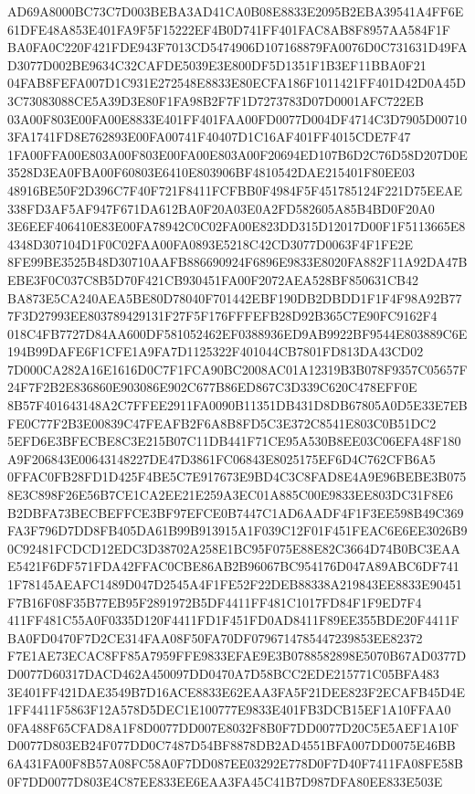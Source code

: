 \documentclass[UTF8,fontset=fandol,zihao=-4,a4paper]{ctexart}
\begin{document}
{{AD69A8000BC73C7D003BEBA3AD41CA0B08E8833E2095B2EBA39541A4FF6E61DFE48A853E401FA9F5F15222EF4B0D741FF401FAC8AB8F8957AA584F1F
BA0FA0C220F421FDE943F7013CD5474906D107168879FA0076D0C731631D49FAD3077D002BE9634C32CAFDE5039E3E800DF5D1351F1B3EF11BBA0F21
04FAB8FEFA007D1C931E272548E8833E80ECFA186F1011421FF401D42D0A45D3C73083088CE5A39D3E80F1FA98B2F7F1D7273783D07D0001AFC722EB
03A00F803E00FA00E8833E401FF401FAA00FD0077D004DF4714C3D7905D007103FA1741FD8E762893E00FA00741F40407D1C16AF401FF4015CDE7F47
1FA00FFA00E803A00F803E00FA00E803A00F20694ED107B6D2C76D58D207D0E3528D3EA0FBA00F60803E6410E803906BF4810542DAE215401F80EE03
48916BE50F2D396C7F40F721F8411FCFBB0F4984F5F451785124F221D75EEAE338FD3AF5AF947F671DA612BA0F20A03E0A2FD582605A85B4BD0F20A0
3E6EEF406410E83E00FA78942C0C02FA00E823DD315D12017D00F1F5113665E84348D307104D1F0C02FAA00FA0893E5218C42CD3077D0063F4F1FE2E
8FE99BE3525B48D30710AAFB886690924F6896E9833E8020FA882F11A92DA47BEBE3F0C037C8B5D70F421CB930451FA00F2072AEA528BF850631CB42
BA873E5CA240AEA5BE80D78040F701442EBF190DB2DBDD1F1F4F98A92B777F3D27993EE803789429131F27F5F176FFFEFB28D92B365C7E90FC9162F4
018C4FB7727D84AA600DF581052462EF0388936ED9AB9922BF9544E803889C6E194B99DAFE6F1CFE1A9FA7D1125322F401044CB7801FD813DA43CD02
7D000CA282A16E1616D0C7F1FCA90BC2008AC01A12319B3B078F9357C05657F24F7F2B2E836860E903086E902C677B86ED867C3D339C620C478EFF0E
8B57F401643148A2C7FFEE2911FA0090B11351DB431D8DB67805A0D5E33E7EBFE0C77F2B3E00839C47FEAFB2F6A8B8FD5C3E372C8541E803C0B51DC2
5EFD6E3BFECBE8C3E215B07C11DB441F71CE95A530B8EE03C06EFA48F180A9F206843E00643148227DE47D3861FC06843E8025175EF6D4C762CFB6A5
0FFAC0FB28FD1D425F4BE5C7E917673E9BD4C3C8FAD8E4A9E96BEBE3B0758E3C898F26E56B7CE1CA2EE21E259A3EC01A885C00E9833EE803DC31F8E6
B2DBFA73BECBEFFCE3BF97EFCE0B7447C1AD6AADF4F1F3EE598B49C369FA3F796D7DD8FB405DA61B99B913915A1F039C12F01F451FEAC6E6EE3026B9
0C92481FCDCD12EDC3D38702A258E1BC95F075E88E82C3664D74B0BC3EAAE5421F6DF571FDA42FFAC0CBE86AB2B96067BC954176D047A89ABC6DF741
1F78145AEAFC1489D047D2545A4F1FE52F22DEB88338A219843EE8833E90451F7B16F08F35B77EB95F2891972B5DF4411FF481C1017FD84F1F9ED7F4
411FF481C55A0F0335D120F4411FD1F451FD0AD8411F89EE355BDE20F4411FBA0FD0470F7D2CE314FAA08F50FA70DF0796714785447239853EE82372
F7E1AE73ECAC8FF85A7959FFE9833EFAE9E3B0788582898E5070B67AD0377DD0077D60317DACD462A450097DD0470A7D58BCC2EDE215771C05BFA483
3E401FF421DAE3549B7D16ACE8833E62EAA3FA5F21DEE823F2ECAFB45D4E1FF4411F5863F12A578D5DEC1E100777E9833E401FB3DCB15EF1A10FFAA0
0FA488F65CFAD8A1F8D0077DD007E8032F8B0F7DD0077D20C5E5AEF1A10FD0077D803EB24F077DD0C7487D54BF8878DB2AD4551BFA007DD0075E46BB
6A431FA00F8B57A08FC58A0F7DD087EE03292E778D0F7D40F7411FA08FE58B0F7DD0077D803E4C87EE833EE6EAA3FA45C41B7D987DFA80EE833E503E
}}
\end{document}
